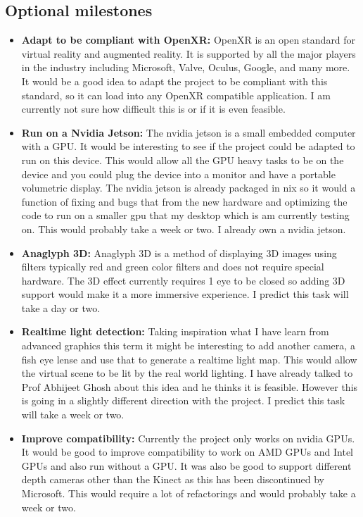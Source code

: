 \subsection{Optional milestones}
\begin{itemize}
    \item \textbf{Adapt to be compliant with OpenXR:} OpenXR is an open standard for virtual reality and augmented reality. It is supported by all the major players in the industry including Microsoft, Valve, Oculus, Google, and many more. It would be a good idea to adapt the project to be compliant with this standard, so it can load into any OpenXR compatible application. I am currently not sure how difficult this is or if it is even feasible.
 
    \item \textbf{Run on a Nvidia Jetson:} The nvidia jetson is a small embedded computer with a GPU. It would be interesting to see if the project could be adapted to run on this device. This would allow all the GPU heavy tasks to be on the device and you could plug the device into a monitor and have a portable volumetric display. The nvidia jetson is already packaged in nix so it would a function of fixing and bugs that from the new hardware and optimizing the code to run on a smaller gpu that my desktop which is am currently testing on. This would probably take a week or two. I already own a nvidia jetson.

    \item \textbf{Anaglyph 3D:} Anaglyph 3D is a method of displaying 3D images using filters typically red and green color filters and does not require special hardware. The 3D effect currently requires 1 eye to be closed so adding 3D support would make it a more immersive experience. I predict this task will take a day or two.
    
    \item \textbf{Realtime light detection:} Taking inspiration what I have learn from advanced graphics this term it might be interesting to add another camera, a fish eye lense and use that to generate a realtime light map. This would allow the virtual scene to be lit by the real world lighting. I have already talked to Prof Abhijeet Ghosh about this idea and he thinks it is feasible. However this is going in a slightly different direction with the project. I predict this task will take a week or two.
    
    \item \textbf{Improve compatibility:} Currently the project only works on nvidia GPUs. It would be good to improve compatibility to work on AMD GPUs and Intel GPUs and also run without a GPU. It was also be good to support different depth cameras other than the Kinect as this has been discontinued by Microsoft. This would require a lot of refactorings and would probably take a week or two.
\end{itemize}